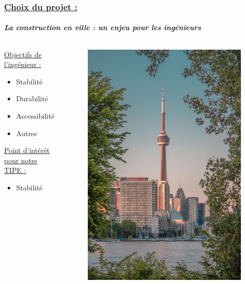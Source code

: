 \documentclass[10pt]{beamer}
\begin{document}
	\begin{frame}
		\frametitle{\uline{Choix du projet :}}
		\framesubtitle{\textit{La construction en ville : un enjeu pour les ing\'enieurs}}
		\begin{columns}[t]
  			\begin{column}{5cm} 
				\begin{block}{}
					\uline{Objectifs de l'ing\'enieur :}
  					\begin{itemize}
						\item Stabilit\'e
						\item Durabilit\'e
						\item Accessibilit\'e
						\item Autres
					\end{itemize}
					\uline{Point d'int\'er\^et pour notre TIPE :}
					\begin{itemize}
						\item Stabilit\'e
					\end{itemize}
				\end{block}
  			\end{column}
 			\begin{column}{5cm}
 				\begin{figure}
   					\includegraphics[scale = 0.125]{Images/city.png}

\end{figure}
\end{column}
\end{columns}
\end{frame}
\end{document}
